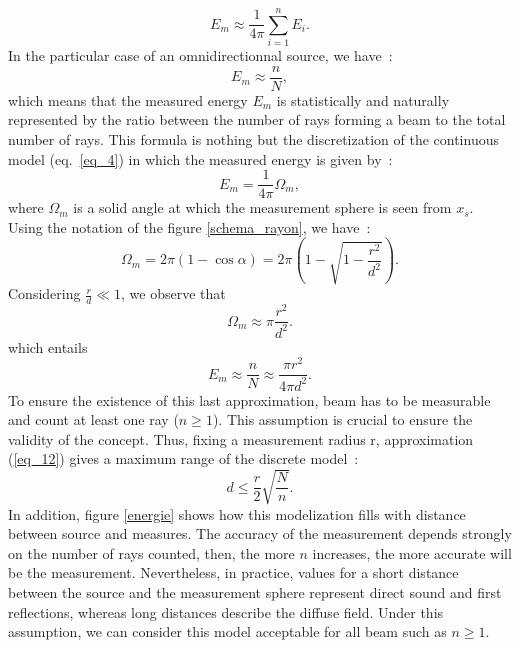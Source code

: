 \documentclass{aes2e}
\begin{document}
\begin{equation}
E_m \approx  \frac{1}{4\pi}  \sum_{i=1}^n E_i.
\end{equation}
In the particular case of an omnidirectionnal source, we have~: 
\begin{equation}
E_m \approx  \frac{n}{N},
\label{eq_7}
\end{equation}
which means that the measured energy $E_m$ is statistically and naturally represented by the ratio between the number of rays forming a beam to the total number of rays. This formula is nothing but the discretization of the continuous model (eq.~\ref{eq_4}) in which the measured energy is given by~:
\begin{equation}
E_m = \frac{1}{4\pi}  \Omega_m,
\end{equation}
where $\Omega_m$ is a solid angle at which the measurement sphere is seen from $x_s$. Using the notation of the figure \ref{schema_rayon}, we have~:
\begin{equation}
\Omega_m = 2\pi(1-\cos{\alpha}) = 2\pi \left( 1 - \sqrt{1-\frac{r^2}{d^2}} \right).
\end{equation}
Considering $\frac{r}{d} \ll 1$, we observe that
\begin{equation}
\Omega_m \approx \pi \frac{r^2}{d^2}.
\end{equation}
which entails
\begin{equation}
E_m \approx  \frac{n}{N} \approx  \frac{\pi r^2}{4\pi d^2}.
\label{eq_12}
\end{equation}
To ensure the existence of this last approximation, beam has to be measurable and count at least one ray ($n\geq1$). This assumption is crucial to ensure the validity of the concept. Thus, fixing a measurement radius r, approximation (\ref{eq_12}) gives a maximum range of the discrete model~:  
\begin{equation}
\label{eq_13}
	d \leq \frac{r}{2}\sqrt{\frac{N}{n}}.
\end{equation}
In addition, figure \ref{energie} shows how this modelization fills with distance between source and measures. The accuracy of the measurement depends strongly on the number of  rays counted, then, the more $n$ increases, the more accurate will be the measurement. Nevertheless, in practice, values for a short distance between the source and the measurement sphere represent direct sound and first reflections, whereas long distances describe the diffuse field. Under this assumption, we can consider this model acceptable for all beam such as $n\geq1$. 
\end{document}
